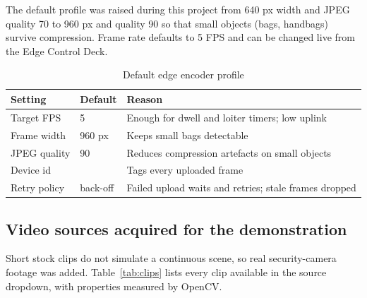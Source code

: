 \documentclass[11pt]{article}
\DeclareRobustCommand{\code}[1]{\texttt{\detokenize{#1}}}
\begin{document}
The default profile was raised during this project from 640 px width and JPEG quality 70 to 960 px and quality 90 so that small objects (bags, handbags) survive compression. Frame rate defaults to 5 FPS and can be changed live from the Edge Control Deck.

\begin{table}[H]
\centering\small
\caption{Default edge encoder profile}
\label{tab:ieee_8}
\begin{tabularx}{\textwidth}{|L{3.4cm}|L{2.2cm}|Y|}
\hline
{} \textbf{Setting} & \textbf{Default} & \textbf{Reason} \\ \hline
Target FPS & 5 & Enough for dwell and loiter timers; low uplink \\ \hline
Frame width & 960 px & Keeps small bags detectable \\ \hline
JPEG quality & 90 & Reduces compression artefacts on small objects \\ \hline
Device id & \code{edge-01} & Tags every uploaded frame \\ \hline
Retry policy & back-off & Failed upload waits and retries; stale frames dropped \\ \hline
\end{tabularx}
\end{table}

\subsection{Video sources acquired for the demonstration}

Short stock clips do not simulate a continuous scene, so real security-camera footage was added. Table~\ref{tab:clips} lists every clip available in the source dropdown, with properties measured by OpenCV.
\end{document}
